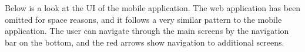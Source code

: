  Below is a look at the UI of the mobile application. The web application has been omitted for space reasons, and it follows a very similar pattern to the mobile application. The user can navigate through the main screens by the navigation bar on the bottom, and the red arrows show navigation to additional screens. 
 

